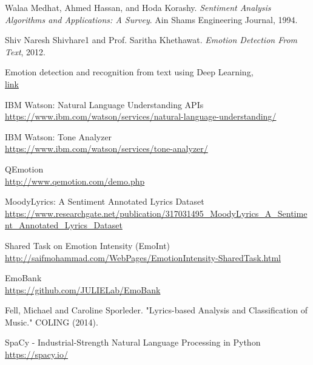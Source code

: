 





\begin{thebibliography}{9}
Walaa Medhat, Ahmed Hassan, and Hoda Korashy. \textit{Sentiment Analysis Algorithms and Applications: A Survey}. Ain Shams Engineering Journal, 1994.
 
Shiv Naresh Shivhare1 and Prof. Saritha Khethawat. \textit{Emotion Detection From Text}, 2012.

 
Emotion detection and recognition from text using Deep Learning,
\\\href{https://www.microsoft.com/developerblog/2015/11/29/emotion-detection-and-recognition-from-text-using-deep-learning/}{link}

 
IBM Watson: Natural Language Understanding APIs
\\\footnotesize \url{https://www.ibm.com/watson/services/natural-language-understanding/}

IBM Watson: Tone Analyzer
\\\footnotesize \url{https://www.ibm.com/watson/services/tone-analyzer/}

QEmotion
\\\footnotesize \url{http://www.qemotion.com/demo.php}

MoodyLyrics: A Sentiment Annotated Lyrics Dataset
\\\footnotesize \url{https://www.researchgate.net/publication/317031495_MoodyLyrics_A_Sentiment_Annotated_Lyrics_Dataset}

Shared Task on Emotion Intensity (EmoInt)
\\\footnotesize \url{http://saifmohammad.com/WebPages/EmotionIntensity-SharedTask.html}

EmoBank
\\\footnotesize \url{https://github.com/JULIELab/EmoBank}

Fell, Michael and Caroline Sporleder. "Lyrics-based Analysis and Classification of Music." COLING (2014).

SpaCy - Industrial-Strength Natural Language Processing in Python
\\\footnotesize \url{https://spacy.io/}


\end{thebibliography}
